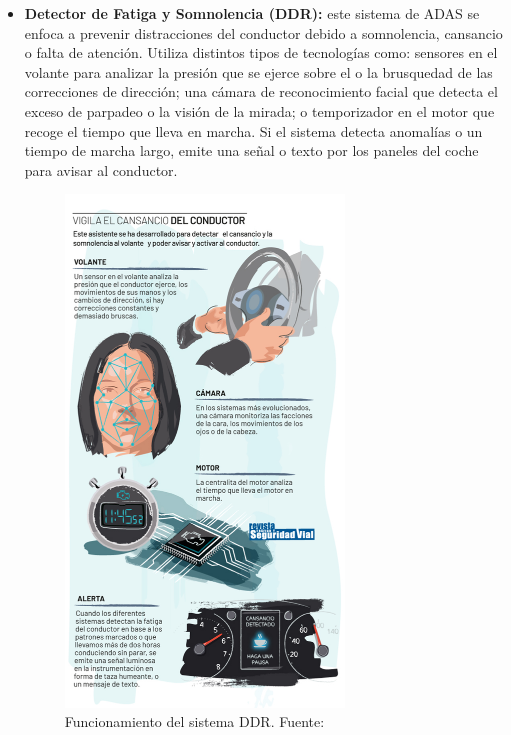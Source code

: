 \documentclass[12pt]{report} %
\begin{document}
\begin{itemize}

    \item \textbf{Detector de Fatiga y Somnolencia (DDR):} este sistema de ADAS se enfoca a prevenir distracciones del conductor debido a somnolencia, cansancio o falta de atención. Utiliza distintos tipos de tecnologías como: sensores en el volante para analizar la presión que se ejerce sobre el o la brusquedad de las correcciones de dirección; una cámara de reconocimiento facial que detecta el exceso de parpadeo o la visión de la mirada; o temporizador en el motor que recoge el tiempo que lleva en marcha. Si el sistema detecta anomalías o un tiempo de marcha largo, emite una señal o texto por los paneles del coche para avisar al conductor.
    \begin{figure}[H]
		\centering
		\includegraphics[width=0.7\textwidth]{adasDDR.jpg}
		\caption{Funcionamiento del sistema DDR. Fuente: \cite{adasObligatorios}}
		\label{fig:imagen11}
	\end{figure}

\end{itemize}
\end{document}
